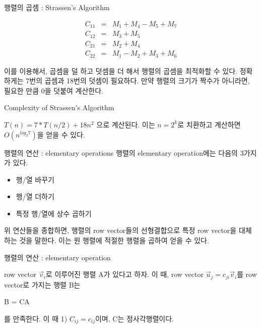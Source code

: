\documentclass{beamer}
\begin{document}
\begin{frame}{행렬의 곱셈 : Strassen's Algorithm} 

\begin{eqnarray} 
C_{11} & = & M_1 + M_4 - M_5 + M_7 \\
C_{12} & = & M_3 + M_5 \\
C_{21} & = & M_2 + M_4 \\
C_{22} & = & M_1 - M_2 + M_3 + M_6
\end{eqnarray}

이를 이용해서, 곱셈을 덜 하고 덧셈을 더 해서 행렬의 곱셈을 최적화할 수 있다. 정확하게는 7번의 곱셈과 18번의 덧셈이 필요하다. 만약 행렬의 크기가 짝수가 아니라면, 필요한 만큼 0을 덧붙여 계산한다. 

\end{frame}

\begin{frame}{Complexity of Strassen's Algorithm} 

$T(n) = 7*T(n/2) + 18n^2$ 으로 계산된다. 이는 $n=2^k$로 치환하고 계산하면 $O(n^{log_2 7})$을 얻을 수 있다. 

\end{frame} 






\begin{frame}{행렬의 연산 : elementary operations} 
행렬의 elementary operation에는 다음의 3가지가 있다. 

\begin{itemize} 
\item 행/열 바꾸기 
\item 행/열 더하기
\item 특정 행/열에 상수 곱하기
\end{itemize}

위 연산들을 종합하면, 행렬의 row vector들의 선형결합으로 특정 row vector을 대체하는 것을 말한다. 이는 원 행렬에 적절한 행렬을 곱하여 얻을 수 있다. 

\end{frame}

\begin{frame}{행렬의 연산 : elementary operation } 

row vector $\vec{v}_i$로 이루어진 행렬 A가 있다고 하자. 이 때, row vector $\vec{u}_j = c_{ji} \vec{v}_i$를 row vector로 가지는 행렬 B는 

B = CA 

를 만족한다. 이 때 1) $C_{ij} = c_{ij}$이며, C는 정사각행렬이다.

\end{frame}
\end{document}
